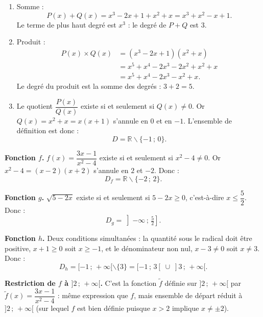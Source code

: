 \documentclass[11pt]{article}
\def\setminus{\mathbin{\backslash}}\let\smallsetminus\setminus
\begin{document}
\begin{corrige}
\begin{enumerate}
\item Somme :
\[ P(x)+Q(x)=x^3-2x+1+x^2+x=x^3+x^2-x+1. \]
Le terme de plus haut degré est $x^3$ : le degré de $P+Q$ est $\boxed{3}$.
\item Produit :
\begin{align*}
P(x)\times Q(x)&=(x^3-2x+1)(x^2+x)\\
&=x^5+x^4-2x^3-2x^2+x^2+x\\
&=x^5+x^4-2x^3-x^2+x.
\end{align*}
Le degré du produit est la somme des degrés : $3+2=\boxed{5}$.
\item Le quotient $\dfrac{P(x)}{Q(x)}$ existe si et seulement si $Q(x)\neq 0$. Or $Q(x)=x^2+x=x(x+1)$ s'annule en $0$ et en $-1$. L'ensemble de définition est donc :
\[ D=\mathbb{R}\setminus\{-1\,;\,0\}. \]
\end{enumerate}
\end{corrige}

\begin{corrige}
\textbf{Fonction $f$.} $f(x)=\dfrac{3x-1}{x^2-4}$ existe si et seulement si $x^2-4\neq 0$. Or $x^2-4=(x-2)(x+2)$ s'annule en $2$ et $-2$. Donc :
\[ D_f=\mathbb{R}\setminus\{-2\,;\,2\}. \]

\textbf{Fonction $g$.} $\sqrt{5-2x}$ existe si et seulement si $5-2x\geq 0$, c'est-à-dire $x\leq \dfrac{5}{2}$. Donc :
\[ D_g=\left]-\infty\,;\,\tfrac{5}{2}\right]. \]

\textbf{Fonction $h$.} Deux conditions simultanées : la quantité sous le radical doit être positive, $x+1\geq 0$ soit $x\geq -1$, et le dénominateur non nul, $x-3\neq 0$ soit $x\neq 3$. Donc :
\[ D_h=[-1\,;\,+\infty[\setminus\{3\}=[-1\,;\,3[\;\cup\;]3\,;\,+\infty[. \]

\textbf{Restriction de $f$ à $]2\,;\,+\infty[$.} C'est la fonction $\tilde{f}$ définie sur $]2\,;\,+\infty[$ par $\tilde{f}(x)=\dfrac{3x-1}{x^2-4}$ : même expression que $f$, mais ensemble de départ réduit à $]2\,;\,+\infty[$ (sur lequel $f$ est bien définie puisque $x>2$ implique $x\neq \pm 2$).
\end{corrige}
\end{document}

